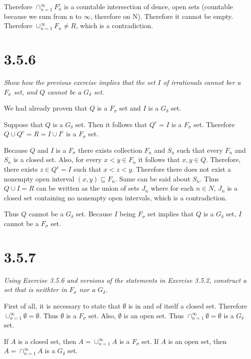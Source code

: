 \documentclass[11pt,oneside,titlepage]{book}
\begin{document}
Therefore $\cap_{n = 1}^{\infty}F_n^c$ is a countable intersection of dence,
open sets (countable because we sum from n to $\infty$, therefore on N).
Therefore it cannot be empty. Therefore $\cup_{n = 1}^{\infty}F_n \neq R$,
which is a contradiction.

\section*{3.5.6}
\textit{Show how the previous exercise implies that the set $I$ of irrationals
  cannot ber a $F_\sigma$ set, and $Q$ cannot be a $G_\delta$ set.}

We had already proven that $Q$ is a $F_\sigma$ set and $I$ is a
$G_\delta$ set. 

Suppose that $Q$ is a $G_\delta$ set. Then it follows that $Q^c = I$ is a
$F_\sigma$ set. Therefore $Q \cup Q^c = R = I \cup I^c$ is a $F_\sigma$ set.

Because $Q$ and $I$ is a $F_\sigma$ there exists collection $F_n$ and $S_n$
such that every $F_n$ and $S_n$ is a closed set. Also, for every
$x < y \in F_n$  it follows that $x, y \in Q$. Therefore, there exists
$z \in Q^c = I$ such that $x < z < y$. Therefore there does not exist
a nonempty open interval $(x, y) \subseteq F_n$. Same can be said
about $S_n$. Thus $Q \cup I = R$ can be written as the union of sets
$J_n$ where for each $n \in N$, $J_n$ is a closed set containing no nonempty
open intervals, which is a contradiction.

Thus $Q$ cannot be a $G_\delta$ set. Because  $I$ being $F_\sigma$ set implies
that $Q$ is a $G_\delta$ set, $I$ cannot be a $F_\sigma$ set.


\section*{3.5.7}
\textit{Using Exercise 3.5.6 and versions of the statements in Exercise 3.5.2,
  construct a set that is neithter in $F_\sigma$ nor a $G_\delta$.}

First of all, it is necessary to state that $\emptyset$ is in and of itself a
closed set. Therefore $\cup_{n = 1}^{\infty} \emptyset = \emptyset$. Thus
$\emptyset$ is a $F_\sigma$ set. Also, $\emptyset$ is an open set. Thus
$\cap_{n = 1}^{\infty} \emptyset = \emptyset$ is a $G_\delta$ set.

If $A$ is a closed set, then $A = \cup_{n = 1}^{\infty} A$ is a $F_\sigma$ set.
If $A$ is an open set, then $A = \cap_{n = 1}^{\infty} A$ is a $G_\delta$ set.
\end{document}
